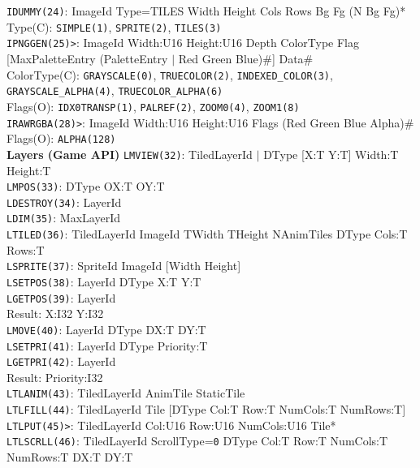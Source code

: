 \documentclass[a4paper,twocolumn,11pt]{article}
\begin{document}
\begin{flushleft}
{\tt IDUMMY(24)}: ImageId Type=TILES Width Height Cols Rows Bg Fg (N Bg Fg)* \\
Type(C): {\tt SIMPLE(1)}, {\tt SPRITE(2)}, {\tt TILES(3)} \\
\vskip 4pt
{\tt IPNGGEN(25)>}: ImageId  Width:U16 Height:U16 Depth ColorType Flag
[MaxPaletteEntry (PaletteEntry $|$ Red Green Blue)\#] Data\# \\
ColorType(C): {\tt GRAYSCALE(0)}, {\tt TRUECOLOR(2)}, {\tt INDEXED\_COLOR(3)},
{\tt GRAYSCALE\_ALPHA(4)}, {\tt TRUECOLOR\_ALPHA(6)}\\
Flags(O): {\tt IDX0TRANSP(1)}, {\tt PALREF(2)}, {\tt ZOOM0(4)}, {\tt ZOOM1(8)} \\
\vskip 4pt
{\tt IRAWRGBA(28)>}: ImageId Width:U16 Height:U16 Flags
(Red Green Blue Alpha)\# \\
Flags(O): {\tt ALPHA(128)} \\
\vskip 6pt
{\bf Layers (Game API)}
\vskip 2pt
{\tt LMVIEW(32)}: TiledLayerId $|$ DType [X:T Y:T] Width:T Height:T \\
\vskip 4pt
{\tt LMPOS(33)}: DType OX:T OY:T \\
\vskip 4pt
{\tt LDESTROY(34)}: LayerId \\
\vskip 4pt
{\tt LDIM(35)}: MaxLayerId \\
\vskip 4pt
{\tt LTILED(36)}: TiledLayerId ImageId TWidth THeight NAnimTiles DType
Cols:T Rows:T \\
\vskip 4pt
{\tt LSPRITE(37)}: SpriteId ImageId [Width Height] \\
\vskip 4pt
{\tt LSETPOS(38)}: LayerId DType X:T Y:T \\
\vskip 4pt
{\tt LGETPOS(39)}: LayerId \\
Result: X:I32 Y:I32 \\
\vskip 4pt
{\tt LMOVE(40)}: LayerId DType DX:T DY:T \\
\vskip 4pt
{\tt LSETPRI(41)}: LayerId DType Priority:T \\
\vskip 4pt
{\tt LGETPRI(42)}: LayerId \\
Result: Priority:I32 \\
\vskip 4pt
{\tt LTLANIM(43)}: TiledLayerId AnimTile StaticTile\\
\vskip 4pt
{\tt LTLFILL(44)}: TiledLayerId Tile [DType Col:T Row:T NumCols:T NumRows:T] \\
\vskip 4pt
{\tt LTLPUT(45)>}: TiledLayerId Col:U16 Row:U16 NumCols:U16 Tile* \\
\vskip 4pt
{\tt LTLSCRLL(46)}: TiledLayerId ScrollType={\tt 0} DType Col:T Row:T NumCols:T NumRows:T
DX:T DY:T \\

\end{flushleft}
\end{document}
